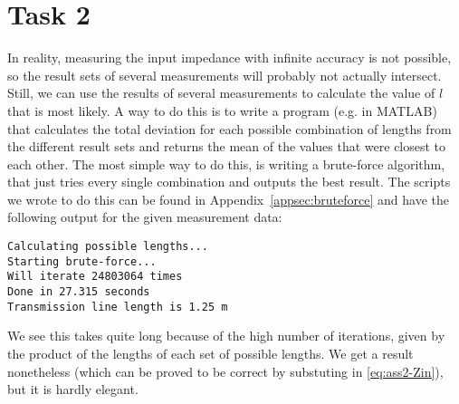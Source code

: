 \documentclass[11pt,titlepage]{report}
\begin{document}
\section{Task 2}
In reality, measuring the input impedance with infinite accuracy is not possible, so the result sets of several measurements will probably not actually intersect.
\\
Still, we can use the results of several measurements to calculate the value of $l$ that is most likely. A way to do this is to write a program (e.g. in MATLAB) that calculates the total deviation for each possible combination of lengths from the different result sets and returns the mean of the values that were closest to each other. The most simple way to do this, is writing a brute-force algorithm, that just tries every single combination and outputs the best result. The scripts we wrote to do this can be found in Appendix~\ref{appsec:bruteforce} and have the following output for the given measurement data:

\begin{verbatim}
Calculating possible lengths...
Starting brute-force...
Will iterate 24803064 times
Done in 27.315 seconds
Transmission line length is 1.25 m
\end{verbatim}

We see this takes quite long because of the high number of iterations, given by the product of the lengths of each set of possible lengths. We get a result nonetheless (which can be proved to be correct by substuting in \ref{eq:ass2-Zin}), but it is hardly elegant.
\end{document}
